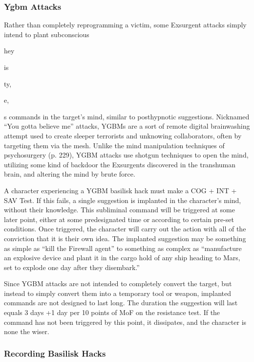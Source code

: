 \subsubsection{Ygbm Attacks }

Rather than completely reprogramming a victim, some 
Exsurgent attacks simply intend to plant subconscious 

hey 

is

ty, 

e,

s
commands in the target's mind, similar to posthypnotic
suggestions. Nicknamed ``You gotta believe me''
attacks, YGBMs are a sort of remote digital brainwashing
attempt used to create sleeper terrorists and
unknowing collaborators, often by targeting them via 
the mesh. Unlike the mind manipulation techniques 
of psychosurgery (p. 229), YGBM attacks use shotgun 
techniques to open the mind, utilizing some kind of 
backdoor the Exsurgents discovered in the transhuman
brain, and altering the mind by brute force.

A character experiencing a YGBM basilisk hack 
must make a COG + INT + SAV Test. If this fails, a 
single suggestion is implanted in the character's mind, 
without their knowledge. This subliminal command 
will be triggered at some later point, either at some 
predesignated time or according to certain pre-set 
conditions. Once triggered, the character will carry 
out the action with all of the conviction that it is their 
own idea. The implanted suggestion may be something 
as simple as ``kill the Firewall agent'' to something as 
complex as ``manufacture an explosive device and 
plant it in the cargo hold of any ship heading to Mars, 
set to explode one day after they disembark.''

Since YGBM attacks are not intended to completely 
convert the target, but instead to simply convert them 
into a temporary tool or weapon, implanted commands
are not designed to last long. The duration
the suggestion will last equals 3 days +1 day per 10 
points of MoF on the resistance test. If the command 
has not been triggered by this point, it dissipates, and 
the character is none the wiser.

\subsubsection{Recording Basilisk Hacks}

